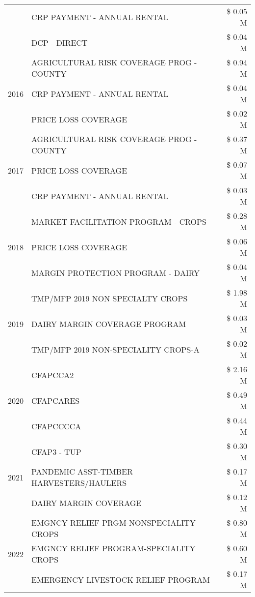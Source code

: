 \begin{tabular}{llr}
 & CRP PAYMENT - ANNUAL RENTAL & \$ 0.05 M \\
 & DCP - DIRECT & \$ 0.04 M \\
\cline{1-3}
\multirow[t]{3}{*}{2016} & AGRICULTURAL RISK COVERAGE PROG - COUNTY & \$ 0.94 M \\
 & CRP PAYMENT - ANNUAL RENTAL & \$ 0.04 M \\
 & PRICE LOSS COVERAGE & \$ 0.02 M \\
\cline{1-3}
\multirow[t]{3}{*}{2017} & AGRICULTURAL RISK COVERAGE PROG - COUNTY & \$ 0.37 M \\
 & PRICE LOSS COVERAGE & \$ 0.07 M \\
 & CRP PAYMENT - ANNUAL RENTAL & \$ 0.03 M \\
\cline{1-3}
\multirow[t]{3}{*}{2018} & MARKET FACILITATION PROGRAM - CROPS & \$ 0.28 M \\
 & PRICE LOSS COVERAGE & \$ 0.06 M \\
 & MARGIN PROTECTION PROGRAM - DAIRY & \$ 0.04 M \\
\cline{1-3}
\multirow[t]{3}{*}{2019} & TMP/MFP 2019 NON SPECIALTY CROPS & \$ 1.98 M \\
 & DAIRY MARGIN COVERAGE PROGRAM & \$ 0.03 M \\
 & TMP/MFP 2019 NON-SPECIALITY CROPS-A & \$ 0.02 M \\
\cline{1-3}
\multirow[t]{3}{*}{2020} & CFAPCCA2 & \$ 2.16 M \\
 & CFAPCARES & \$ 0.49 M \\
 & CFAPCCCCA & \$ 0.44 M \\
\cline{1-3}
\multirow[t]{3}{*}{2021} & CFAP3 - TUP & \$ 0.30 M \\
 & PANDEMIC ASST-TIMBER HARVESTERS/HAULERS & \$ 0.17 M \\
 & DAIRY MARGIN COVERAGE & \$ 0.12 M \\
\cline{1-3}
\multirow[t]{3}{*}{2022} & EMGNCY RELIEF PRGM-NONSPECIALITY CROPS & \$ 0.80 M \\
 & EMGNCY RELIEF PROGRAM-SPECIALITY CROPS & \$ 0.60 M \\
 & EMERGENCY LIVESTOCK RELIEF PROGRAM & \$ 0.17 M \\
\cline{1-3}
\bottomrule
\end{tabular}
